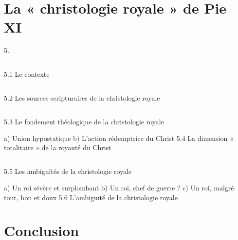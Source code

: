 \section{La « christologie royale » de Pie XI } 5. 

\subsection{}5.1 Le contexte 

\subsection{}5.2 Les sources scripturaires de la christologie royale 

\subsection{}5.3 Le fondement théologique de la christologie royale 

a) Union hypostatique b) L’action rédemptrice du Christ 5.4 La dimension « totalitaire » de la royauté du Christ 

\subsection{}5.5 Les ambiguïtés de la christologie royale  

a) Un roi sévère et surplombant b) Un roi, chef de guerre ? c) Un roi, malgré tout, bon et doux 5.6 L’ambiguïté de la christologie royale 

\section{Conclusion } 